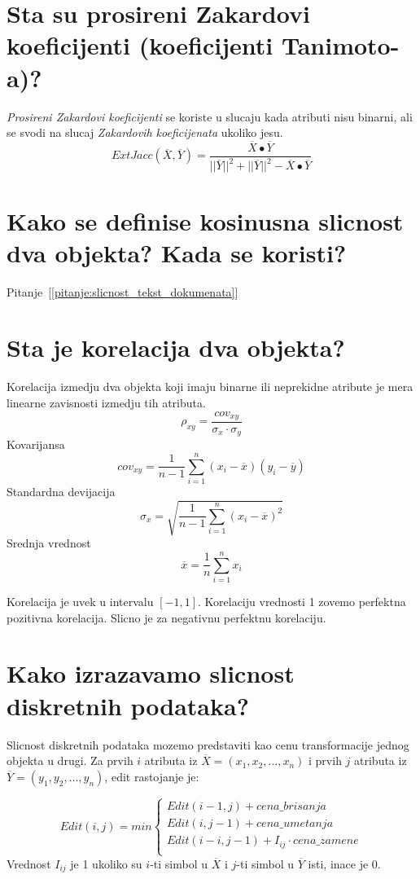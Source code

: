 \documentclass[a4paper]{article}
\begin{document}
\section{Sta su prosireni Zakardovi koeficijenti (koeficijenti Tanimoto-a)?}
\emph{Prosireni Zakardovi koeficijenti} se koriste u slucaju kada atributi nisu binarni, ali se
svodi na slucaj \emph{Zakardovih koeficijenata} ukoliko jesu.
\[
    ExtJacc(\overline{X},\overline{Y}) =
    \dfrac{
        \overline{X} \bullet \overline{Y}
    }{
        ||\overline{Y}||^2 + ||\overline{Y}||^2
        - \overline{X} \bullet \overline{Y}
    }
\]

\section{Kako se definise kosinusna slicnost dva objekta? Kada se koristi?}

Pitanje~[\ref{pitanje:slicnost_tekst_dokumenata}]

\section{Sta je korelacija dva objekta?}
Korelacija izmedju dva objekta koji imaju binarne ili neprekidne atribute je mera linearne
zavisnosti izmedju tih atributa.
\[
    \rho_{xy} = \dfrac{cov_{xy}}{\sigma_x \cdot \sigma_y}
\]
Kovarijansa
\[
    cov_{xy} = \dfrac{1}{n-1}\sum_{i=1}^{n} (x_i - \overline{x})(y_i - \overline{y})
\]
Standardna devijacija
\[
    \sigma_x = \sqrt{\dfrac{1}{n-1}\sum_{i=1}^{n} (x_i - \overline{x})^2}
\]
Srednja vrednost
\[
    \overline{x} = \dfrac{1}{n}\sum_{i=1}^{n} x_i
\]

Korelacija je uvek u intervalu \([-1,1]\). Korelaciju vrednosti 1 zovemo perfektna pozitivna
korelacija. Slicno je za negativnu perfektnu korelaciju.


\section{Kako izrazavamo slicnost diskretnih podataka?}
Slicnost diskretnih podataka mozemo predstaviti kao cenu transformacije jednog objekta u drugi.
Za prvih \(i\) atributa iz \(\overline{X}=(x_1,x_2,\ldots,x_n)\) i prvih \(j\) atributa iz
\(\overline{Y}=(y_1,y_2,\ldots,y_n)\), edit rastojanje je:

\[
    Edit(i, j) = min
    \begin{cases}
        Edit(i-1, j) + cena\_brisanja \\
        Edit(i, j-1) + cena\_umetanja \\
        Edit(i-i, j-1) + I_{ij} \cdot cena\_zamene \\
    \end{cases}
\]
Vrednost \(I_{ij}\) je 1 ukoliko su \(i\)-ti simbol u \(\overline{X}\) i \(j\)-ti simbol u
\(\overline{Y}\) isti, inace je 0.
\end{document}
